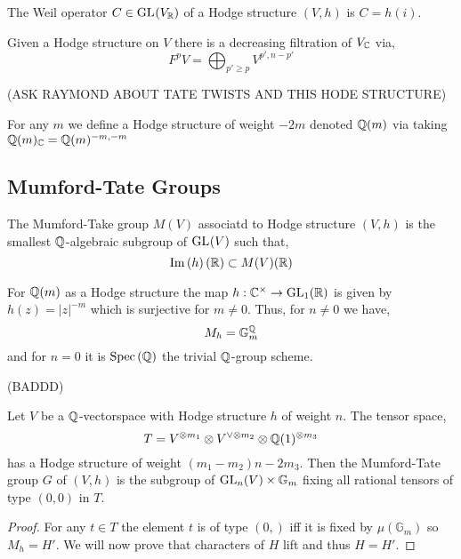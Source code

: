 \documentclass[12pt]{article}
\begin{document}
\begin{definition}
The Weil operator $C \in \mathrm{GL}_{}(V_{\mathbb{R}})$ of a Hodge structure $(V, h)$ is $C = h(i)$. 
\end{definition}

\begin{proposition}
Given a Hodge structure on $V$ there is a decreasing filtration of $V_{\mathbb{C}}$ via,
\[ F^p V = \bigoplus_{p' \ge p} V^{p', n - p'} \]
\end{proposition}

(ASK RAYMOND ABOUT TATE TWISTS AND THIS HODE STRUCTURE)

\begin{example}
For any $m$ we define a Hodge structure of weight $-2m$ denoted $\mathbb{Q}(m)$ via taking $\mathbb{Q}(m)_{\mathbb{C}} = \mathbb{Q}(m)^{-m,-m}$ 
\end{example}

\subsection{Mumford-Tate Groups}


\begin{definition}
The Mumford-Take group $M(V)$ associatd to  Hodge structure $(V, h)$ is the smallest $\mathbb{Q}$-algebraic subgroup of $\mathrm{GL}_{}(V)$ such that,
\[ \mathrm{Im}\left( h \right)(\mathbb{R}) \subset M(V)(\mathbb{R}) \]
\end{definition}

\begin{example}
For $\mathbb{Q}(m)$ as a Hodge structure the map $h : \mathbb{C}^\times \to \mathrm{GL}_{1}(\mathbb{R})$ is given by $h(z) = |z|^{-m}$ which is surjective for $m \neq 0$. Thus, for $n \neq 0$ we have,
\[ M_h = \mathbb{G}_{m}^{\mathbb{Q}} \]
and for $n = 0$ it is $\mathrm{Spec}\left( \mathbb{Q} \right)$ the trivial $\mathbb{Q}$-group scheme. 
\end{example}


(BADDD)

\begin{proposition}
Let $V$ be a $\mathbb{Q}$-vectorspace with Hodge structure $h$ of weight $n$. The tensor space,
\[ T = V^{\otimes m_1} \otimes V^{\vee \otimes m_2} \otimes \mathbb{Q}(1)^{\otimes m_3} \]
has a Hodge structure of weight $(m_1 - m_2)n  - 2 m_3$. Then the Mumford-Tate group $G$ of $(V, h)$ is the subgroup of $\mathrm{GL}_{n}(V) \times \mathbb{G}_m$ fixing all rational tensors of type $(0, 0)$ in $T$. 
\end{proposition}

\begin{proof}
For any $t \in T$ the element $t$ is of type $(0, )$ iff it is fixed by $\mu(\mathbb{G}_m)$ so $M_h = H'$. We will now prove that characters of $H$ lift and thus $H = H'$. 
\end{proof}
\end{document}
